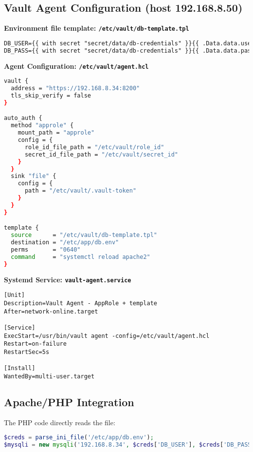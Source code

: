 \documentclass[12pt]{report}
\begin{document}
\subsection*{Vault Agent Configuration (host 192.168.8.50)}

\textbf{Environment file template: \texttt{/etc/vault/db-template.tpl}}

\begin{lstlisting}[language=html]
DB_USER={{ with secret "secret/data/db-credentials" }}{{ .Data.data.username }}{{ end }}
DB_PASS={{ with secret "secret/data/db-credentials" }}{{ .Data.data.password }}{{ end }}
\end{lstlisting}

\textbf{Agent Configuration: \texttt{/etc/vault/agent.hcl}}

\begin{lstlisting}[language=bash]
vault {
  address = "https://192.168.8.34:8200"
  tls_skip_verify = false
}

auto_auth {
  method "approle" {
    mount_path = "approle"
    config = {
      role_id_file_path = "/etc/vault/role_id"
      secret_id_file_path = "/etc/vault/secret_id"
    }
  }
  sink "file" {
    config = {
      path = "/etc/vault/.vault-token"
    }
  }
}

template {
  source      = "/etc/vault/db-template.tpl"
  destination = "/etc/app/db.env"
  perms       = "0640"
  command     = "systemctl reload apache2"
}
\end{lstlisting}

\textbf{Systemd Service: \texttt{vault-agent.service}}

\begin{lstlisting}[]
[Unit]
Description=Vault Agent - AppRole + template
After=network-online.target

[Service]
ExecStart=/usr/bin/vault agent -config=/etc/vault/agent.hcl
Restart=on-failure
RestartSec=5s

[Install]
WantedBy=multi-user.target
\end{lstlisting}

\subsection*{Apache/PHP Integration}

The PHP code directly reads the file:

\begin{lstlisting}[language=php]
$creds = parse_ini_file('/etc/app/db.env');
$mysqli = new mysqli('192.168.8.34', $creds['DB_USER'], $creds['DB_PASS'], 'fortune_quotes');
\end{lstlisting}
\end{document}
